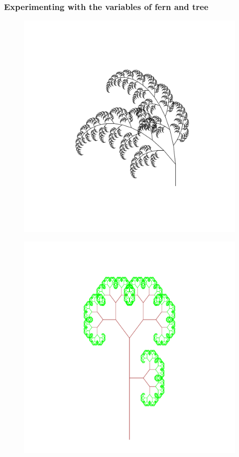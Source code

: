 \documentclass[11pt]{article}
\begin{document}
\subsubsection*{Experimenting with the variables of fern and tree}
\begin{figure}[h]
\includegraphics[width=0.5\linewidth]{../Results/Challenge_F_Fern.pdf}
\end{figure}

\begin{figure}[h]
\includegraphics[width=0.5\linewidth]{../Results/Challenge_F_Tree.pdf}
\end{figure}
\end{document}
